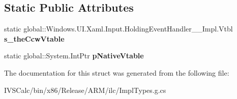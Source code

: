 \subsection*{Static Public Attributes}
\begin{DoxyCompactItemize}
\item 
\mbox{\label{struct_windows_1_1_u_i_1_1_xaml_1_1_input_1_1_holding_event_handler_____impl_1_1_vtbl_a171697a4a2ebb78a12e06d90c6e87f35}} 
static global\+::\+Windows.\+U\+I.\+Xaml.\+Input.\+Holding\+Event\+Handler\+\_\+\+\_\+\+Impl.\+Vtbl {\bfseries s\+\_\+the\+Ccw\+Vtable}
\item 
\mbox{\label{struct_windows_1_1_u_i_1_1_xaml_1_1_input_1_1_holding_event_handler_____impl_1_1_vtbl_a203be273ebe393c1691b2d6eb251d0d1}} 
static global\+::\+System.\+Int\+Ptr {\bfseries p\+Native\+Vtable}
\end{DoxyCompactItemize}


The documentation for this struct was generated from the following file\+:\begin{DoxyCompactItemize}
\item 
I\+V\+S\+Calc/bin/x86/\+Release/\+A\+R\+M/ilc/Impl\+Types.\+g.\+cs\end{DoxyCompactItemize}
